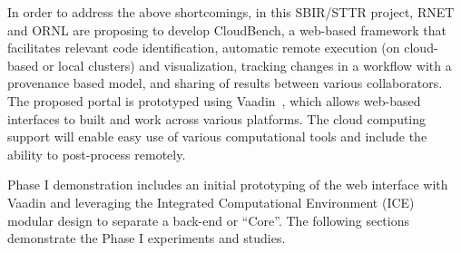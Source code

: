 In order to address the above shortcomings, in this SBIR/STTR project, RNET and 
ORNL are proposing to
develop CloudBench, a web-based framework that facilitates relevant code 
identification, automatic remote execution (on cloud-based or local clusters) 
and visualization, tracking changes in a workflow with a provenance based 
model, and sharing of results between various collaborators. The proposed 
portal is prototyped using Vaadin~\cite{vaadin}, which allows web-based 
interfaces to built and work across various platforms. The cloud computing 
support will enable easy use of various computational tools and include the 
ability to post-process remotely.

Phase I demonstration includes an initial prototyping of the web interface with 
Vaadin and leveraging the Integrated Computational Environment (ICE) modular 
design to separate a back-end or ``Core''. The following sections demonstrate 
the Phase I experiments and studies. 
